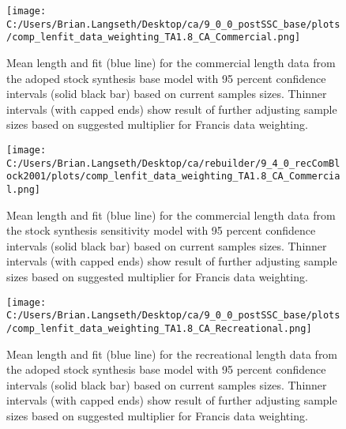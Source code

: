 \documentclass[11pt,
  english,
  letterpaper,
]{article}
\begin{document}
\tagmcend\tagstructend


\begin{figure}
\centering
\texttt{[image: C:/Users/Brian.Langseth/Desktop/ca/9\_0\_0\_postSSC\_base/plots/comp\_lenfit\_data\_weighting\_TA1.8\_CA\_Commercial.png]}
\caption{Mean length and fit (blue line) for the commercial length data from the adoped stock synthesis base model with 95 percent confidence intervals (solid black bar) based on current samples sizes. Thinner intervals (with capped ends) show result of further adjusting sample sizes based on suggested multiplier for Francis data weighting.\label{fig:MeanLengthFit-com-base}}
\end{figure}

\tagmcend\tagstructend


\begin{figure}
\centering
\texttt{[image: C:/Users/Brian.Langseth/Desktop/ca/rebuilder/9\_4\_0\_recComBlock2001/plots/comp\_lenfit\_data\_weighting\_TA1.8\_CA\_Commercial.png]}
\caption{Mean length and fit (blue line) for the commercial length data from the stock synthesis sensitivity model with 95 percent confidence intervals (solid black bar) based on current samples sizes. Thinner intervals (with capped ends) show result of further adjusting sample sizes based on suggested multiplier for Francis data weighting.\label{fig:MeanLengthFit-com-sens}}
\end{figure}

\tagmcend\tagstructend


\begin{figure}
\centering
\texttt{[image: C:/Users/Brian.Langseth/Desktop/ca/9\_0\_0\_postSSC\_base/plots/comp\_lenfit\_data\_weighting\_TA1.8\_CA\_Recreational.png]}
\caption{Mean length and fit (blue line) for the recreational length data from the adoped stock synthesis base model with 95 percent confidence intervals (solid black bar) based on current samples sizes. Thinner intervals (with capped ends) show result of further adjusting sample sizes based on suggested multiplier for Francis data weighting.\label{fig:MeanLengthFit-rec-base}}
\end{figure}
\end{document}
